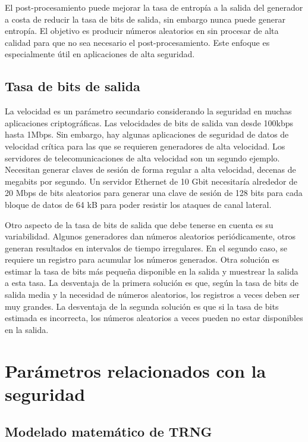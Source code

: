 	El post-procesamiento puede mejorar la tasa de entropía a la salida del generador a costa de reducir la tasa de bits de salida, sin embargo nunca puede generar entropía.
	El objetivo es producir números aleatorios en sin procesar de alta calidad para que no sea necesario el post-procesamiento. Este enfoque es especialmente útil en aplicaciones de alta seguridad.
		
	\subsection{Tasa de bits de salida}
	
	La velocidad es un parámetro secundario considerando la seguridad en muchas aplicaciones criptográficas. Las velocidades de bits de salida van desde 100kbps  hasta 1Mbps. Sin embargo, hay algunas aplicaciones de seguridad de datos de velocidad crítica para las que se requieren generadores de alta velocidad. Los servidores de telecomunicaciones de alta velocidad son un segundo ejemplo. Necesitan generar claves de sesión de forma regular a alta velocidad, decenas de megabits por segundo. Un servidor Ethernet de 10 Gbit necesitaría alrededor de 20 Mbps de bits aleatorios para generar una clave de sesión de 128 bits para cada bloque de datos de 64 kB para poder resistir los ataques de canal lateral. 
					
	Otro aspecto de la tasa de bits de salida que debe tenerse en cuenta es su variabilidad. Algunos generadores dan números aleatorios periódicamente, otros generan resultados en intervalos de tiempo irregulares. En el segundo caso, se requiere un registro para acumular los números generados. Otra solución es estimar la tasa de bits más pequeña disponible en la salida y muestrear la salida a esta tasa. La desventaja de la primera solución es que, según la tasa de bits de salida media y la necesidad de números aleatorios, los registros a veces deben ser muy grandes. La desventaja de la segunda solución es que si la tasa de bits estimada es incorrecta, los números aleatorios a veces pueden no estar disponibles en la salida.	
	
	
	\section{Parámetros relacionados con la seguridad}
	
	\subsection{Modelado matemático de TRNG}
	
